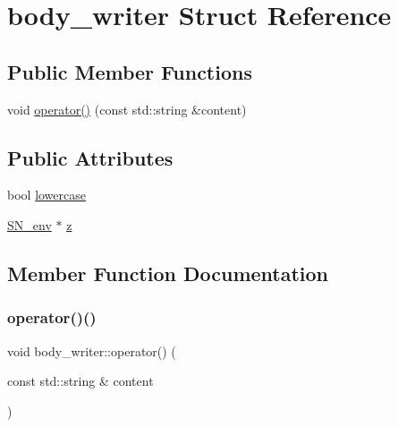 \hypertarget{structbody__writer}{}\section{body\+\_\+writer Struct Reference}
\label{structbody__writer}
\subsection*{Public Member Functions}
\begin{DoxyCompactItemize}
\item 
void \mbox{\hyperlink{structbody__writer_a6050dfcfb3991a16c29775c3f1fcba81}{operator()}} (const std\+::string \&content)
\end{DoxyCompactItemize}
\subsection*{Public Attributes}
\begin{DoxyCompactItemize}
\item 
bool \mbox{\hyperlink{structbody__writer_a6df150a131f73f0174993cf6c496312f}{lowercase}}
\item 
\mbox{\hyperlink{structSN__env}{S\+N\+\_\+env}} $\ast$ \mbox{\hyperlink{structbody__writer_a1243ddb44270e6f0542f9cb5e31d20d5}{z}}
\end{DoxyCompactItemize}


\subsection{Member Function Documentation}
\mbox{\label{structbody__writer_a6050dfcfb3991a16c29775c3f1fcba81}} 
\subsubsection{\texorpdfstring{operator()()}{operator()()}}
{\footnotesize\ttfamily void body\+\_\+writer\+::operator() (\begin{DoxyParamCaption}\item[{const std\+::string \&}]{content }\end{DoxyParamCaption})\hspace{0.3cm}{\ttfamily [inline]}}



